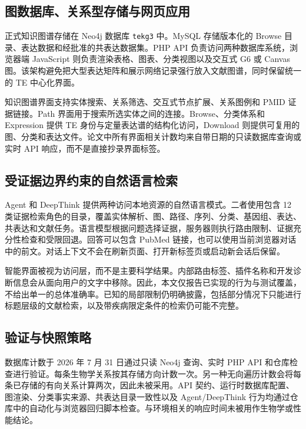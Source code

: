 \subsection{图数据库、关系型存储与网页应用}

正式知识图谱存储在 Neo4j 数据库 \texttt{tekg3} 中。MySQL 存储版本化的 Browse 目录、表达数据和经批准的共表达数据集。PHP API 负责访问两种数据库系统，浏览器端 JavaScript 则负责渲染表格、图表、分类视图以及交互式 G6 或 Canvas 图。该架构避免把大型表达矩阵和展示网络记录强行放入文献图谱，同时保留统一的 TE 中心化界面。

知识图谱界面支持实体搜索、关系筛选、交互式节点扩展、关系图例和 PMID 证据链接。Path 界面用于搜索所选实体之间的连接。Browse、分类体系和 Expression 提供 TE 身份与定量表达谱的结构化访问，Download 则提供可复用的图、分类和表达文件。论文中所有界面相关计数均来自带日期的只读数据库查询或实时 API 响应，而不是直接抄录界面标签。

\subsection{受证据边界约束的自然语言检索}

Agent 和 DeepThink 提供两种访问本地资源的自然语言模式。二者使用包含 12 类证据检索角色的目录，覆盖实体解析、图、路径、序列、分类、基因组、表达、共表达和文献任务。语言模型根据问题选择证据，服务器则执行路由限制、证据充分性检查和受限回退。回答可以包含 PubMed 链接，也可以使用当前浏览器对话中的前文。对话上下文不会在刷新页面、打开新标签页或启动新会话后保留。

智能界面被视为访问层，而不是主要科学结果。内部路由标签、插件名称和开发诊断信息会从面向用户的文字中移除。因此，本文仅报告已实现的行为与测试覆盖，不给出单一的总体准确率。已知的局部限制仍明确披露，包括部分情况下只能进行标题层级的文献检索，以及带疾病限定条件的检索仍可能不完整。

\subsection{验证与快照策略}

数据库计数于 2026 年 7 月 31 日通过只读 Neo4j 查询、实时 PHP API 和仓库检查进行验证。每条生物学关系按其存储方向计数一次。另一种无向遍历计数会将每条已存储的有向关系计算两次，因此未被采用。API 契约、运行时数据库配置、图渲染、分类事实来源、共表达目录一致性以及 Agent/DeepThink 行为均通过仓库中的自动化与浏览器回归脚本检查。与环境相关的响应时间未被用作生物学或性能结论。
